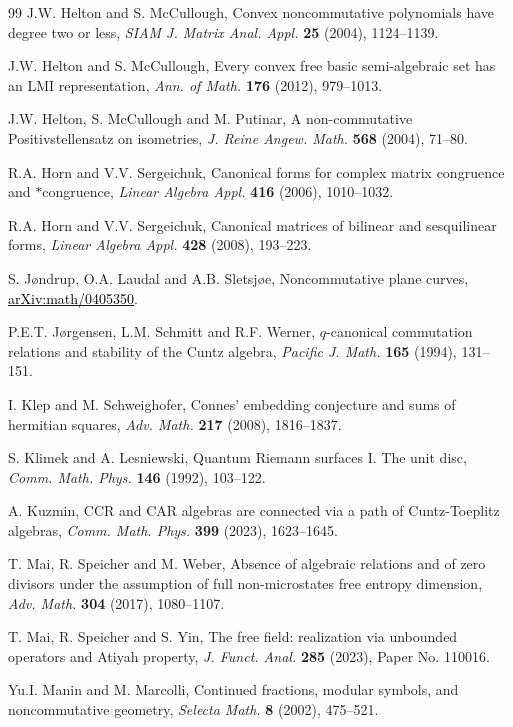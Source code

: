 \documentclass[11pt]{amsart}
\theoremstyle{definition}
\begin{document}
\begin{thebibliography}{99}
 J.W. Helton and S. McCullough, Convex noncommutative polynomials have degree two or less, {\em SIAM J. Matrix Anal. Appl.} {\bf 25} (2004), 1124--1139.

 J.W. Helton and S. McCullough, Every convex free basic semi-algebraic set has an LMI representation, {\em Ann. of Math.} {\bf 176} (2012), 979--1013.

 J.W. Helton, S. McCullough and M. Putinar, A non-commutative Positivstellensatz on isometries, {\em J. Reine Angew. Math.} {\bf 568} (2004), 71--80.

 R.A. Horn and V.V. Sergeichuk, Canonical forms for complex matrix congruence and $*$congruence, {\em Linear Algebra Appl.} {\bf 416} (2006), 1010--1032.

 R.A. Horn and V.V. Sergeichuk, Canonical matrices of bilinear and sesquilinear forms, {\em Linear Algebra Appl.} {\bf 428} (2008), 193--223.

 S. J\o ndrup, O.A. Laudal and A.B. Sletsj\o e, Noncommutative plane curves, \href{https://arxiv.org/pdf/math/0405350}{\textcolor{black}{\mbox{arXiv:math/0405350}}}.

 P.E.T. J\o rgensen, L.M. Schmitt and R.F. Werner, $q$-canonical commutation relations and stability of the Cuntz algebra, {\em Pacific J. Math.} {\bf 165} (1994), 131--151.

 I. Klep and M. Schweighofer, Connes' embedding conjecture and sums of hermitian squares, {\em Adv. Math.} {\bf 217} (2008), 1816--1837.

 S. Klimek and A. Lesniewski, Quantum Riemann surfaces I. The unit disc, {\em Comm. Math. Phys.} {\bf 146} (1992), 103--122.

 A. Kuzmin, CCR and CAR algebras are connected via a path of Cuntz-Toeplitz algebras, {\em Comm. Math. Phys.} {\bf 399} (2023), 1623--1645.

 T. Mai, R. Speicher and M. Weber, Absence of algebraic relations and of zero divisors under the assumption of full non-microstates free entropy dimension, {\em Adv. Math.} {\bf 304} (2017), 1080--1107.

 T. Mai, R. Speicher and S. Yin, The free field: realization via unbounded operators and Atiyah property, {\em J. Funct. Anal.} {\bf 285} (2023), Paper No. 110016.

 Yu.I. Manin and M. Marcolli, Continued fractions, modular symbols, and noncommutative geometry, {\em Selecta Math.} {\bf 8} (2002), 475--521.


\end{thebibliography}
\end{document}
